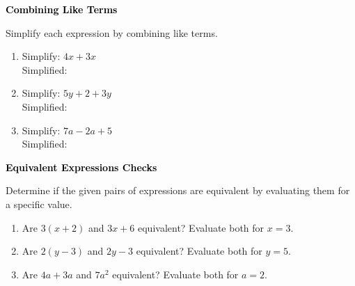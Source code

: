 \documentclass[12pt, letterpaper, fleqn]{article}
\newcommand{\blanklong}{\underline{\hspace{6.5cm}}}
\begin{document}
\begin{tcolorbox}[colback=black!10]
\large\textcolor{black}{\textbf{Combining Like Terms}}
\end{tcolorbox}

\noindent
Simplify each expression by combining like terms.

\vspace{3mm}

\begin{enumerate}[itemsep=2.2cm, leftmargin=0.6cm]

\item Simplify: $4x + 3x$ \\
Simplified: \blanklong

\vspace{2cm}

\item Simplify: $5y + 2 + 3y$ \\
Simplified: \blanklong

\vspace{2cm}

\item Simplify: $7a - 2a + 5$ \\
Simplified: \blanklong

\vspace{2cm}

\end{enumerate}

\newpage

\begin{tcolorbox}[colback=black!10]
\large\textcolor{black}{\textbf{Equivalent Expressions Checks}}
\end{tcolorbox}

\noindent
Determine if the given pairs of expressions are equivalent by evaluating them for a specific value.

\vspace{3mm}

\begin{enumerate}[itemsep=2.2cm, leftmargin=0.6cm]

\item Are $3(x + 2)$ and $3x + 6$ equivalent? Evaluate both for $x = 3$.

\vspace{2cm}

\item Are $2(y - 3)$ and $2y - 3$ equivalent? Evaluate both for $y = 5$.

\vspace{2cm}

\item Are $4a + 3a$ and $7a^2$ equivalent? Evaluate both for $a = 2$.

\vspace{2cm}

\end{enumerate}
\end{document}
